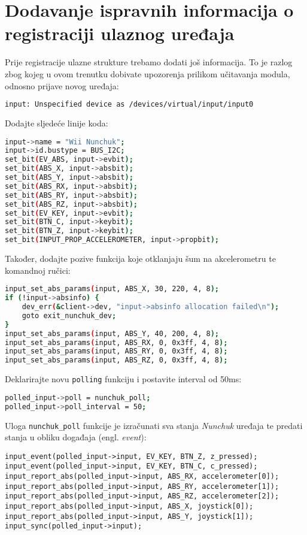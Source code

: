 \documentclass[11pt]{article}
\begin{document}
\section{Dodavanje ispravnih informacija o registraciji ulaznog uređaja}
Prije registracije ulazne strukture trebamo dodati još informacija.
To je razlog zbog kojeg u ovom trenutku dobivate upozorenja
prilikom učitavanja modula, odnosno prijave novog uređaja:
\begin{lstlisting}[language=bash]
input: Unspecified device as /devices/virtual/input/input0
\end{lstlisting}
Dodajte sljedeće linije koda:
\begin{lstlisting}[language=bash]
input->name = "Wii Nunchuk";
input->id.bustype = BUS_I2C;
set_bit(EV_ABS, input->evbit);
set_bit(ABS_X, input->absbit);
set_bit(ABS_Y, input->absbit);
set_bit(ABS_RX, input->absbit);
set_bit(ABS_RY, input->absbit);
set_bit(ABS_RZ, input->absbit);
set_bit(EV_KEY, input->evbit);
set_bit(BTN_C, input->keybit);
set_bit(BTN_Z, input->keybit);
set_bit(INPUT_PROP_ACCELEROMETER, input->propbit);
\end{lstlisting}
Također, dodajte pozive funkcija koje otklanjaju šum na akcelerometru te
komandnoj ručici:
\begin{lstlisting}[language=bash]
input_set_abs_params(input, ABS_X, 30, 220, 4, 8);
if (!input->absinfo) {
	dev_err(&client->dev, "input->absinfo allocation failed\n");
	goto exit_nunchuk_dev;
}
input_set_abs_params(input, ABS_Y, 40, 200, 4, 8);
input_set_abs_params(input, ABS_RX, 0, 0x3ff, 4, 8);
input_set_abs_params(input, ABS_RY, 0, 0x3ff, 4, 8);
input_set_abs_params(input, ABS_RZ, 0, 0x3ff, 4, 8);
\end{lstlisting}
Deklarirajte novu \texttt{polling} funkciju i postavite interval od 50ms:
\begin{lstlisting}[language=bash]
polled_input->poll = nunchuk_poll;
polled_input->poll_interval = 50;
\end{lstlisting}
Uloga \texttt{nunchuk\_poll} funkcije je izračunati sva stanja \textit{Nunchuk}
uređaja te predati stanja u obliku događaja (engl. \textit{event}):
\begin{lstlisting}
input_event(polled_input->input, EV_KEY, BTN_Z, z_pressed);
input_event(polled_input->input, EV_KEY, BTN_C, c_pressed);
input_report_abs(polled_input->input, ABS_RX, accelerometer[0]);
input_report_abs(polled_input->input, ABS_RY, accelerometer[1]);
input_report_abs(polled_input->input, ABS_RZ, accelerometer[2]);
input_report_abs(polled_input->input, ABS_X, joystick[0]);
input_report_abs(polled_input->input, ABS_Y, joystick[1]);
input_sync(polled_input->input);
\end{lstlisting}
\end{document}
